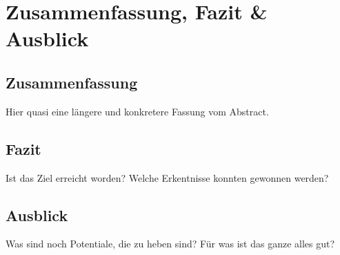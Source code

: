 

\chapter{Zusammenfassung, Fazit \& Ausblick}\label{ch:zusammenfassung}
\section{Zusammenfassung}
Hier quasi eine längere und konkretere Fassung vom Abstract.
\section{Fazit}
Ist das Ziel erreicht worden? 
Welche Erkentnisse konnten gewonnen werden?
\section{Ausblick}
Was sind noch Potentiale, die zu heben sind?
Für was ist das ganze alles gut?
